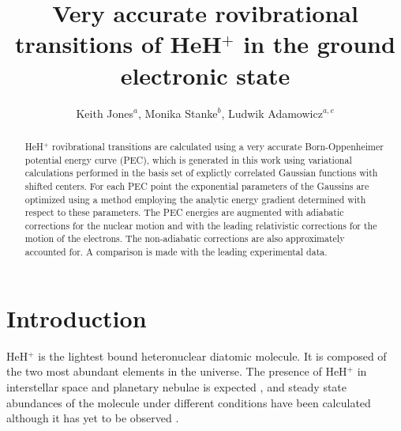 \documentclass[aps,onecolumn]{revtex4}
\begin{document}
\title{Very accurate rovibrational transitions of
HeH$^+$ in the ground electronic state}
\author{
Keith Jones$^{a}$, Monika Stanke$^{b}$, Ludwik Adamowicz$^{a,c}$}

\begin{abstract}
HeH$^+$ rovibrational transitions are calculated using a very accurate Born-Oppenheimer
potential energy curve (PEC), which is generated in this work using variational calculations
performed in the basis set of explictly correlated Gaussian functions with shifted
centers. For each PEC point the exponential parameters of the Gaussins are optimized
using a method employing the analytic energy gradient determined with respect
to these parameters. The PEC energies are augmented 
with adiabatic corrections
for the nuclear motion and with the leading relativistic corrections for 
the motion of the electrons. The non-adiabatic corrections are also
approximately accounted for. A comparison is made
with the leading experimental data.
\end{abstract}

\maketitle

\section{Introduction}
\label{Introduction}
HeH$^+$ is the lightest bound heteronuclear diatomic molecule. It is composed of the
two most abundant elements in the universe. The presence of HeH$^+$ in interstellar space and
planetary nebulae is expected \cite{Astro3, Astro4, Astro5}, and steady state abundances
of the molecule under different conditions have been calculated \cite{Astro1_SS_HeH+} although
it has yet to be observed \cite{Astro2, PES5}.
\end{document}
